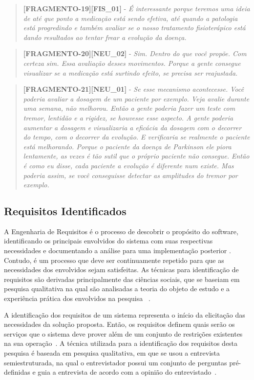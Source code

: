 \begin{quote}
\textbf{[FRAGMENTO-19][FIS\_01]} - 
\emph{
 É interessante porque teremos uma ideia de até que ponto a medicação está sendo efetiva, até quando a patologia está progredindo e também avaliar se o nosso tratamento fisioterápico está dando resultados ao tentar frear a evolução da doença.
}
\end{quote}


\begin{quote}
\textbf{[FRAGMENTO-20][NEU\_02]} - 
\emph{
Sim. Dentro do que você propõe. Com certeza sim. Essa avaliação desses movimentos. Porque a gente consegue visualizar se a medicação está surtindo efeito, se precisa ser reajustada.
}
\end{quote}

\begin{quote}
\textbf{[FRAGMENTO-21][NEU\_01]} - 
\emph{
Se esse mecanismo acontecesse. Você poderia avaliar a dosagem de um paciente por exemplo. Veja avalie durante uma semana, não melhorou. Então a gente poderia fazer um teste com tremor, lentidão e a rigidez, se houvesse esse aspecto.  A gente poderia aumentar a dosagem e visualizaria a eficácia da dosagem com o decorrer do tempo, com o decorrer da evolução. E verificaria se realmente o paciente está melhorando. Porque o paciente da doença de Parkinson ele piora lentamente, as vezes é tão sutil que o próprio paciente não consegue. Então é como eu disse, cada paciente a evolução é diferente num existe. Mas poderia assim, se você conseguisse detectar as amplitudes do tremor por exemplo.
}
\end{quote}


\subsection{Requisitos Identificados}
A Engenharia de Requisitos é o processo de descobrir o propósito do software, identificando os principais envolvidos do sistema com suas respectivas necessidades e documentando a análise para uma implementação posterior \cite{bas00}. Contudo, é um processo que deve ser continuamente repetido para que as necessidades dos envolvidos sejam satisfeitas. As técnicas para identificação de requisitos são derivadas principalmente das ciências sociais, que se baseiam em pesquisa qualitativa na qual são analisadas a teoria do objeto de estudo e a experiência prática dos envolvidos na pesquisa ~\cite{elicquest05,zowghi2005}.

A identificação dos requisitos de um sistema representa o início da elicitação das necessidades da solução proposta. Então, os requisitos definem quais serão os serviços que o sistema deve prover além de um conjunto de restrições existentes na sua operação~\cite{sommerville2011}. A técnica utilizada para a identificação dos requisitos desta pesquisa é baseada em pesquisa qualitativa, em que se usou a entrevista semiestruturada, na qual o entrevistador possui um conjunto de perguntas pré-definidas e guia a entrevista de acordo com a opinião do entrevistado~\cite{FLI04}.

